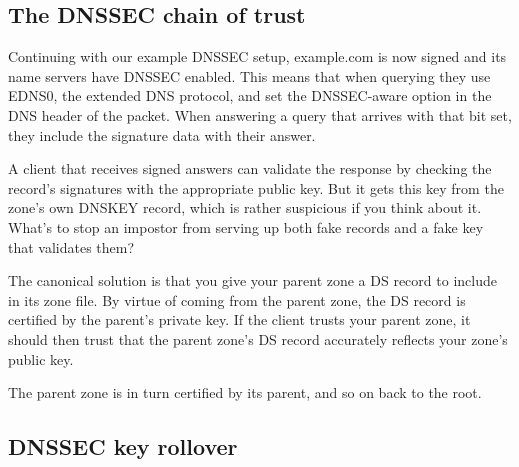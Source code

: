 \protect\hypertarget{part0024_split_065.html}{}{}

\hypertarget{part0024_split_065.htmlux5cux23_idContainer1069}{}
\hypertarget{part0024_split_065.htmlux5cux23calibre_pb_64}{%
\subsection[The DNSSEC chain of
trust]{\texorpdfstring{\protect\hypertarget{part0024_split_065.htmlux5cux23_idTextAnchor945}{}{}The
DNSSEC chain of
trust}{The DNSSEC chain of trust}}\label{part0024_split_065.htmlux5cux23calibre_pb_64}}

\protect\hypertarget{part0024_split_065.htmlux5cux23_idIndexMarker2268}{}{}\protect\hypertarget{part0024_split_065.htmlux5cux23_idIndexMarker2269}{}{}Continuing
with our example DNSSEC setup, example.com is now signed and its name
servers have DNSSEC enabled. This means that when querying they use
EDNS0, the extended DNS protocol, and set the DNSSEC-aware option in the
DNS header of the packet. When answering a query that arrives with that
bit set, they include the signature data with their answer.

A client that receives signed answers can validate the response by
checking the record's signatures with the appropriate public key. But it
gets this key from the zone's own DNSKEY record, which is rather
suspicious if you think about it. What's to stop an impostor from
serving up both fake records and a fake key that validates them?

The canonical solution is that you give your parent zone a DS record to
include in its zone file. By virtue of coming from the parent zone, the
DS record is certified by the parent's private key. If the client trusts
your parent zone, it should then trust that the parent zone's DS record
accurately reflects your zone's public key.

The parent zone is in turn certified by its parent, and so on back to
the root.

\protect\hypertarget{part0024_split_066.html}{}{}

\hypertarget{part0024_split_066.htmlux5cux23_idContainer1069}{}
\hypertarget{part0024_split_066.htmlux5cux23calibre_pb_65}{%
\subsection[DNSSEC key
rollover]{\texorpdfstring{\protect\hypertarget{part0024_split_066.htmlux5cux23_idTextAnchor946}{}{}DNSSEC
key
rollover}{DNSSEC key rollover}}\label{part0024_split_066.htmlux5cux23calibre_pb_65}}

